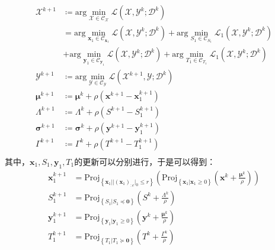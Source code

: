 \begin{equation}
    \begin{aligned}
        \label{tab:equ-3-40}
        \mathcal{X} ^{k+1}&\coloneqq \mathrm{arg}\min_{\mathcal{X} \in \mathcal{C} _{\mathcal{X}}} \mathcal{L} \left( \mathcal{X} ,\mathcal{Y} ^k;\mathcal{D} ^k \right)\\
        &=\mathrm{arg}\min_{\mathbf{x}_1\in \mathcal{C} _{\mathbf{x}_1}} \mathcal{L} \left( \mathcal{X} ,\mathcal{Y} ^k;\mathcal{D} ^k \right) +\mathrm{arg}\min_{S_1\in \mathcal{C} _{S_1}} \mathcal{L} _1\left( \mathcal{X} ,\mathcal{Y} ^k;\mathcal{D} ^k \right)\\
        &+\mathrm{arg}\min_{\mathbf{y}_1\in \mathcal{C} _{\mathbf{y}_1}} \mathcal{L} \left( \mathcal{X} ,\mathcal{Y} ^k;\mathcal{D} ^k \right) +\mathrm{arg}\min_{T_1\in \mathcal{C} _{T_1}} \mathcal{L} _1\left( \mathcal{X} ,\mathcal{Y} ^k;\mathcal{D} ^k \right)\\
        \mathcal{Y} ^{k+1}&\coloneqq \mathrm{arg}\min_{\mathcal{Y} \in \mathcal{C} _{\mathcal{Y}}} \mathcal{L} \left( \mathcal{X} ^{k+1},\mathcal{Y} ;\mathcal{D} ^k \right)\\
        \boldsymbol{\mu }^{k+1}&\coloneqq \boldsymbol{\mu }^k+\rho \left( \mathbf{x}^{k+1}-\mathbf{x}_{1}^{k+1} \right)\\
        \varLambda ^{k+1}&\coloneqq \varLambda ^k+\rho \left( S^{k+1}-S_{1}^{k+1} \right)\\
        \boldsymbol{\sigma }^{k+1}&\coloneqq \boldsymbol{\sigma }^k+\rho \left( \mathbf{y}^{k+1}-\mathbf{y}_{1}^{k+1} \right)\\
        \varGamma ^{k+1}&\coloneqq \varGamma ^k+\rho \left( T^{k+1}-T_{1}^{k+1} \right)\\
    \end{aligned}
\end{equation}
其中，$\mathbf{x}_1,S_1,\mathbf{y}_1,T_1$的更新可以分别进行，于是可以得到：
\begin{equation}
    \label{tab:equ-3-41}
    \begin{aligned}
        \mathbf{x}_{1}^{k+1}&=\mathrm{Proj}_{\left\{ \mathbf{x}_1||\left( \mathbf{x}_1 \right) _{:e}|_0\le r \right\}}\left( \mathrm{Proj}_{\left\{ \mathbf{x}_1|\mathbf{x}_1\geqslant 0 \right\}}\left( \mathbf{x}^k+\frac{\boldsymbol{\mu }^k}{\rho} \right) \right) 
        \\
        S_{1}^{k+1}&=\mathrm{Proj}_{\left\{ S_1|S_1\preceq \mathbf{0} \right\}}\left( S^k+\frac{\varLambda ^k}{\rho} \right) 
        \\
        \mathbf{y}_{1}^{k+1}&=\mathrm{Proj}_{\left\{ \mathbf{y}_1|\mathbf{y}_1\geqslant 0 \right\}}\left( \mathbf{y}^k+\frac{\boldsymbol{\mu }^k}{\rho} \right) 
        \\
        T_{1}^{k+1}&=\mathrm{Proj}_{\left\{ T_1|T_1\succcurlyeq \mathbf{0} \right\}}\left( T^k+\frac{\varGamma ^k}{\rho} \right) 
    \end{aligned}
\end{equation}
